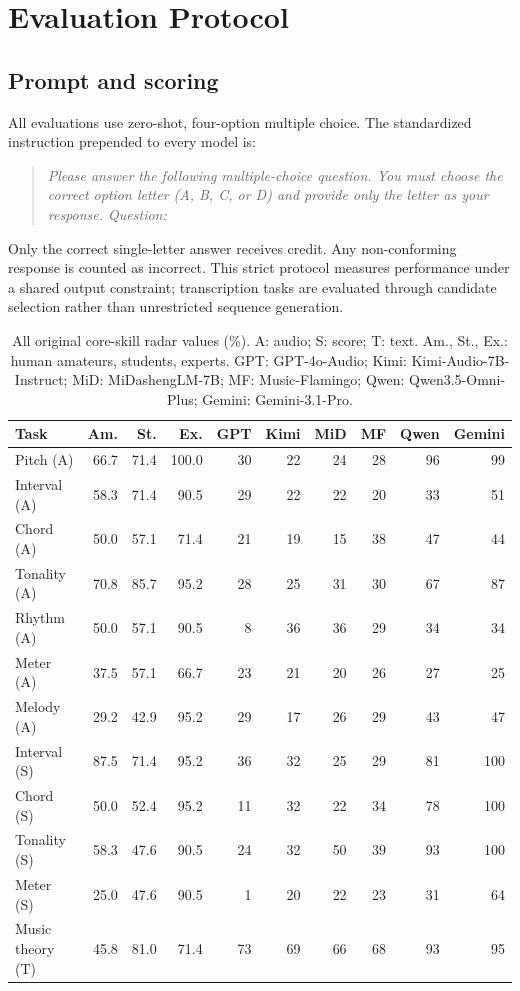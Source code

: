 \documentclass{article}
\begin{document}
\section{Evaluation Protocol}\label{sec:protocol}
\subsection{Prompt and scoring}
All evaluations use zero-shot, four-option multiple choice. The standardized instruction prepended to every model is:
\begin{quote}
\itshape Please answer the following multiple-choice question. You must choose the correct option letter (A, B, C, or D) and provide only the letter as your response. Question:
\end{quote}
Only the correct single-letter answer receives credit. Any non-conforming response is counted as incorrect. This strict protocol measures performance under a shared output constraint; transcription tasks are evaluated through candidate selection rather than unrestricted sequence generation.

\begin{table}[t]
\centering
\caption{All original core-skill radar values (\%). A: audio; S: score; T: text. Am., St., Ex.: human amateurs, students, experts. GPT: GPT-4o-Audio; Kimi: Kimi-Audio-7B-Instruct; MiD: MiDashengLM-7B; MF: Music-Flamingo; Qwen: Qwen3.5-Omni-Plus; Gemini: Gemini-3.1-Pro.}
\label{tab:corevalues}
\setlength{\tabcolsep}{4pt}
\begin{tabularx}{\textwidth}{@{}Xrrrrrrrrr@{}}
\toprule
\textbf{Task} & \textbf{Am.} & \textbf{St.} & \textbf{Ex.} & \textbf{GPT} & \textbf{Kimi} & \textbf{MiD} & \textbf{MF} & \textbf{Qwen} & \textbf{Gemini}\\
\midrule
Pitch (A) & 66.7 & 71.4 & 100.0 & 30 & 22 & 24 & 28 & 96 & 99\\
Interval (A) & 58.3 & 71.4 & 90.5 & 29 & 22 & 22 & 20 & 33 & 51\\
Chord (A) & 50.0 & 57.1 & 71.4 & 21 & 19 & 15 & 38 & 47 & 44\\
Tonality (A) & 70.8 & 85.7 & 95.2 & 28 & 25 & 31 & 30 & 67 & 87\\
Rhythm (A) & 50.0 & 57.1 & 90.5 & 8 & 36 & 36 & 29 & 34 & 34\\
Meter (A) & 37.5 & 57.1 & 66.7 & 23 & 21 & 20 & 26 & 27 & 25\\
Melody (A) & 29.2 & 42.9 & 95.2 & 29 & 17 & 26 & 29 & 43 & 47\\
Interval (S) & 87.5 & 71.4 & 95.2 & 36 & 32 & 25 & 29 & 81 & 100\\
Chord (S) & 50.0 & 52.4 & 95.2 & 11 & 32 & 22 & 34 & 78 & 100\\
Tonality (S) & 58.3 & 47.6 & 90.5 & 24 & 32 & 50 & 39 & 93 & 100\\
Meter (S) & 25.0 & 47.6 & 90.5 & 1 & 20 & 22 & 23 & 31 & 64\\
Music theory (T) & 45.8 & 81.0 & 71.4 & 73 & 69 & 66 & 68 & 93 & 95\\
\bottomrule
\end{tabularx}
\end{table}
\end{document}
